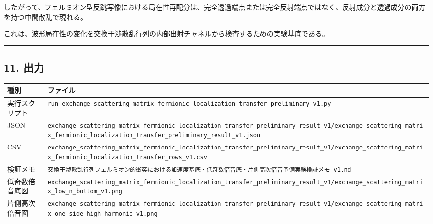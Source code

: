 \documentclass[
  xelatex,
  ja=standard]{bxjsarticle}
\newcounter{none} %
\begin{document}
したがって、フェルミオン型反跳写像における局在性再配分は、完全透過端点または完全反射端点ではなく、反射成分と透過成分の両方を持つ中間散乱で現れる。

これは、波形局在性の変化を交換干渉散乱行列の内部出射チャネルから検査するための実験基底である。

\begin{center}\rule{0.5\linewidth}{0.5pt}\end{center}

\subsection{11. 出力}\label{ux51faux529b}

{\def\LTcaptype{none} %
\begin{longtable}[]{@{}
  >{\raggedright\arraybackslash}p{}
  >{\raggedright\arraybackslash}p{}@{}}
\toprule\noalign{}
\begin{minipage}[b]{\linewidth}\raggedright
種別
\end{minipage} & \begin{minipage}[b]{\linewidth}\raggedright
ファイル
\end{minipage} \\
\midrule\noalign{}
\endhead
\bottomrule\noalign{}
\endlastfoot
実行スクリプト &
\texttt{run\_exchange\_scattering\_matrix\_fermionic\_localization\_transfer\_preliminary\_v1.py} \\
JSON &
\texttt{exchange\_scattering\_matrix\_fermionic\_localization\_transfer\_preliminary\_result\_v1/exchange\_scattering\_matrix\_fermionic\_localization\_transfer\_preliminary\_result\_v1.json} \\
CSV &
\texttt{exchange\_scattering\_matrix\_fermionic\_localization\_transfer\_preliminary\_result\_v1/exchange\_scattering\_matrix\_fermionic\_localization\_transfer\_rows\_v1.csv} \\
検証メモ &
\texttt{交換干渉散乱行列フェルミオン的衝突における加速度基底・低奇数倍音底・片側高次倍音予備実験検証メモ\_v1.md} \\
低奇数倍音底図 &
\texttt{exchange\_scattering\_matrix\_fermionic\_localization\_transfer\_preliminary\_result\_v1/exchange\_scattering\_matrix\_low\_n\_bottom\_v1.png} \\
片側高次倍音図 &
\texttt{exchange\_scattering\_matrix\_fermionic\_localization\_transfer\_preliminary\_result\_v1/exchange\_scattering\_matrix\_one\_side\_high\_harmonic\_v1.png} \\

\end{longtable}}
\end{document}
